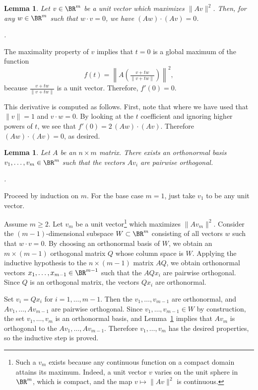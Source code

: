 \documentclass[10pt]{amsart}
\makeatletter
\renewenvironment{proof}[1][\proofname]{\par
	\pushQED{\qed}%
	\normalfont \topsep6\p@\@plus6\p@\relax
	\noindent\emph{#1.} 
	\ignorespaces
}{%
\popQED\endtrivlist\@endpefalse
}
\theoremstyle{mythm}
\newtheorem{lem}[thm]{Lemma}
\theoremstyle{definition}
\theoremstyle{myrmk}
\makeatother
\begin{document}
	\begin{lem} \label{l2} 
		Let $v \in \BR^m$ be a unit vector which maximizes $\lVert Av \rVert^2$. Then, for any $w \in \BR^m$ such that $w \cdot v = 0$, we have $(Aw) \cdot (Av) = 0$. 
	\end{lem}
	\begin{proof}
		The maximality property of $v$ implies that $t = 0$ is a global maximum of the function 
		\[
			f(t) = \left\lVert A\left( \tfrac{v + tw}{\lVert v + tw \rVert} \right) \right \rVert^2, 
		\]
		because $\frac{v + tw}{\lVert v + tw \rVert}$ is a unit vector. Therefore, $f'(0) = 0$. 
		
		This derivative is computed as follows. First, note that 
		where we have used that $\lVert v \rVert = 1$ and $v \cdot w = 0$. By looking at the $t$ coefficient and ignoring higher powers of $t$, we see that $f'(0) = 2\, (Aw) \cdot (Av)$. Therefore $(Aw) \cdot (Av) = 0$, as desired. 		
	\end{proof}
	
	\begin{lem}
		Let $A$ be an $n \times m$ matrix. There exists an orthonormal basis $v_1, \ldots, v_m \in \BR^m$ such that the vectors $Av_i$ are pairwise orthogonal. 
	\end{lem}
	\begin{proof}
		Proceed by induction on $m$. For the base case $m = 1$, just take $v_1$ to be any unit vector. 
		
		Assume $m \ge 2$. Let $v_m$ be a unit vector\footnote{Such a $v_m$ exists because any continuous function on a compact domain attains its maximum. Indeed, a unit vector $v$ varies on the unit sphere in $\BR^m$, which is compact, and the map $v \mapsto \lVert Av \rVert^2$ is continuous.}  which maximizes $\lVert Av_m \rVert^2$. Consider the $(m-1)$-dimensional subspace $W \subset \BR^m$ consisting of all vectors $w$ such that $w \cdot v = 0$. By choosing an orthonormal basis of $W$, we obtain an $m \times (m-1)$ orthogonal matrix $Q$ whose column space is $W$. Applying the inductive hypothesis to the $n \times (m-1)$ matrix $AQ$, we obtain orthonormal vectors $x_1, \ldots, x_{m-1} \in \BR^{m-1}$ such that the $AQx_i$ are pairwise orthogonal. Since $Q$ is an orthogonal matrix, the vectors $Qx_i$ are orthonormal. 
		
		Set $v_i = Qx_i$ for $i = 1, \ldots, m-1$. Then the $v_1, \ldots, v_{m-1}$ are orthonormal, and $Av_1, \ldots, Av_{m-1}$ are pairwise orthogonal. Since $v_1, \ldots, v_{m-1} \in W$ by construction, the set $v_1, \ldots, v_m$ is an orthonormal basis, and Lemma~\ref{l2} implies that $Av_m$ is orthogonal to the $Av_1, \ldots, Av_{m-1}$. Therefore $v_1, \ldots, v_m$ has the desired properties, so the inductive step is proved. 
	\end{proof}
	
\end{document}
